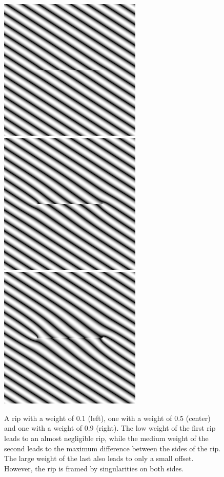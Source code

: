 \documentclass{utue} %
\begin{document}
\begin{figure}[ht]
  \centering
  \includegraphics[width=0.32\linewidth]{images/rip01}
  \hfill
  \includegraphics[width=0.32\linewidth]{images/rip05}
  \hfill
  \includegraphics[width=0.32\linewidth]{images/rip09}
  \caption{A rip with a weight of $0.1$ (left), one with a weight of $0.5$ (center) and one with a weight of $0.9$ (right). The low weight of the first rip leads to an almost negligible rip, while the medium weight of the second leads to the maximum difference between the sides of the rip. The large weight of the last also leads to only a small offset. However, the rip is framed by singularities on both sides.}\label{fig:ripWeight}
\end{figure}
\end{document}
